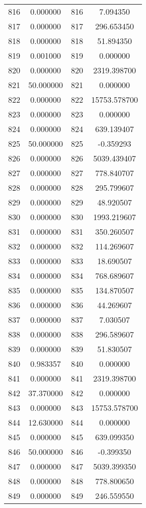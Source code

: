 \documentclass[12pt]{article}
\begin{document}
\begin{longtable}{@{}cccc@{}}
816 & 0.000000 & 816 & 7.094350 \\
817 & 0.000000 & 817 & 296.653450 \\
818 & 0.000000 & 818 & 51.894350 \\
819 & 0.001000 & 819 & 0.000000 \\
820 & 0.000000 & 820 & 2319.398700 \\
821 & 50.000000 & 821 & 0.000000 \\
822 & 0.000000 & 822 & 15753.578700 \\
823 & 0.000000 & 823 & 0.000000 \\
824 & 0.000000 & 824 & 639.139407 \\
825 & 50.000000 & 825 & -0.359293 \\
826 & 0.000000 & 826 & 5039.439407 \\
827 & 0.000000 & 827 & 778.840707 \\
828 & 0.000000 & 828 & 295.799607 \\
829 & 0.000000 & 829 & 48.920507 \\
830 & 0.000000 & 830 & 1993.219607 \\
831 & 0.000000 & 831 & 350.260507 \\
832 & 0.000000 & 832 & 114.269607 \\
833 & 0.000000 & 833 & 18.690507 \\
834 & 0.000000 & 834 & 768.689607 \\
835 & 0.000000 & 835 & 134.870507 \\
836 & 0.000000 & 836 & 44.269607 \\
837 & 0.000000 & 837 & 7.030507 \\
838 & 0.000000 & 838 & 296.589607 \\
839 & 0.000000 & 839 & 51.830507 \\
840 & 0.983357 & 840 & 0.000000 \\
841 & 0.000000 & 841 & 2319.398700 \\
842 & 37.370000 & 842 & 0.000000 \\
843 & 0.000000 & 843 & 15753.578700 \\
844 & 12.630000 & 844 & 0.000000 \\
845 & 0.000000 & 845 & 639.099350 \\
846 & 50.000000 & 846 & -0.399350 \\
847 & 0.000000 & 847 & 5039.399350 \\
848 & 0.000000 & 848 & 778.800650 \\
849 & 0.000000 & 849 & 246.559550 \\

\end{longtable}
\end{document}
